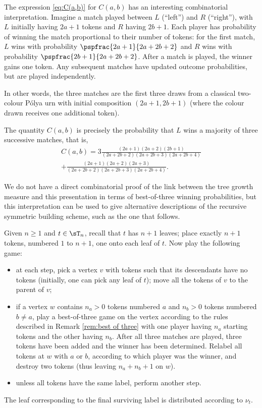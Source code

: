 \begin{rem} \label{rem:best of three}
The expression \eqref{eq:C(a,b)} for $C(a,b)$ has an interesting combinatorial interpretation. Imagine a match played between $L$ (``left'') and $R$ (``right''), with $L$ initially having $2a+1$ tokens and $R$ having $2b+1$. Each player has probability of winning the match proportional to their number of tokens: for the first match, $L$ wins with probability $\pspfrac{2a+1}{2a+2b+2}$ and $R$ wins with probability $\pspfrac{2b+1}{2a+2b+2}$. After a match is played, the winner gains one token. Any subsequent matches have updated outcome probabilities, but are played independently.

In other words, the three matches are the first three draws from a classical two-colour Pólya urn with initial composition $(2a+1,2b+1)$ (where the colour drawn receives one additional token).

The quantity $C(a,b)$ is precisely the probability that $L$ wins a majority of three successive matches, that is,
\begin{multline*}
C(a,b)=3\frac{(2a+1)(2a+2)(2b+1)}{(2a+2b+2)(2a+2b+3)(2a+2b+4)}\\
+\frac{(2a+1)(2a+2)(2a+3)}{(2a+2b+2)(2a+2b+3)(2a+2b+4)}.
\end{multline*}

We do not have a direct combinatorial proof of the link between the tree growth measure and this presentation in terms of best-of-three winning probabilities, but this interpretation can be used to give alternative descriptions of the recursive symmetric building scheme, such as the one that follows.
\end{rem}

\begin{cor}
Given $n\geq 1$ and $t\in\sT_n$, recall that $t$ has $n+1$ leaves; place exactly $n+1$ tokens, numbered $1$ to $n+1$, one onto each leaf of $t$. Now play the following game:
\begin{itemize}
\item at each step, pick a vertex $v$ with tokens such that its descendants have no tokens (initially, one can pick any leaf of $t$); move all the tokens of $v$ to the parent of $v$;
\item if a vertex $w$ contains $n_a>0$ tokens numbered $a$ and $n_b>0$ tokens numbered $b\neq a$, play a best-of-three game on the vertex according to the rules described in Remark \ref{rem:best of three} with one player having $n_a$ starting tokens and the other having $n_b$. After all three matches are played, three tokens have been added and the winner has been determined. Relabel all tokens at $w$ with $a$ or $b$, according to which player was the winner, and destroy two tokens (thus leaving $n_a+n_b+1$ on $w$).
\item unless all tokens have the same label, perform another step.
\end{itemize}

The leaf corresponding to the final surviving label is distributed according to $\nu_t$.
\end{cor}

